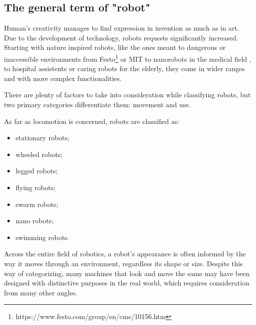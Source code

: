 \documentclass[runningheads,a4paper,12pt]{report}
\begin{document}
\subsection{The general term of "robot"}
Human's creativity manages to find expression in invention as much as in art. Due to the development of technology, robots requests significantly increased. Starting with nature inspired robots, like the ones meant to dangerous or inaccessible environments from Festo\footnote{https://www.festo.com/group/en/cms/10156.htm} or MIT \cite{mit} to nanorobots in the medical field \cite{microrobots}, to hospital assistents or caring robots for the elderly, they come in wider ranges and with more complex functionalities. 

There are plenty of factors to take into consideration while classifying robots, but two primary categories differentiate them: movement and use.

As far as locomotion is concerned, robots are classified as:
\begin{multicols}{2}
\begin{itemize}
\item stationary robots;
\item wheeled robots;
\item legged robots;
\item flying robots;
\item swarm robots;
\item nano robots;
\item swimming robots.
\end{itemize}
\end{multicols}

Across the entire field of robotics, a robot's appearance is often informed by the way it moves through an environment, regardless its shape or size. Despite this way of categorizing, many machines that look and move the same may have been designed with distinctive purposes in the real world, which requires consideration from many other angles.
\end{document}
